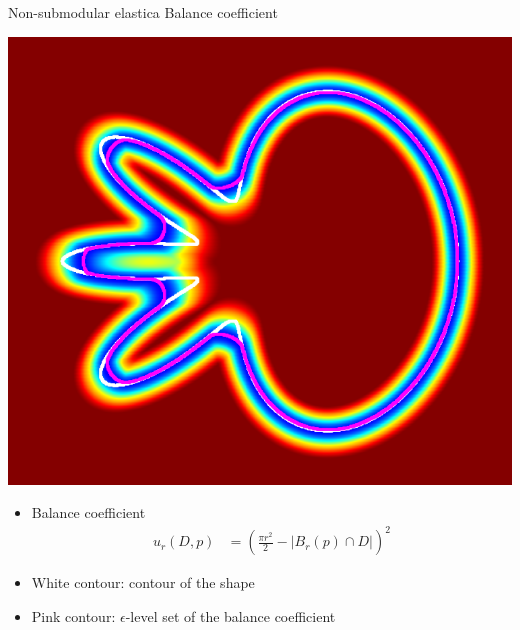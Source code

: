 \begin{frame}
{Non-submodular elastica}
{Balance coefficient}
\begin{minipage}{0.5\textwidth}
\center
\includegraphics[scale=0.2]{figures/non-submodular-elastica/balance-coefficient-zero-level-set.png}
\end{minipage}
\begin{minipage}{0.49\textwidth}
\footnotesize
\begin{itemize}
\item{Balance coefficient}
\begin{align*}
u_r(D,p) &= \left( \frac{\pi r^2}{2} - |B_r(p) \cap D| \right)^2
\end{align*}
\item{White contour: contour of the shape}
\item{Pink contour: $\epsilon$-level set of the balance coefficient}
\end{itemize}
\end{minipage}
\end{frame}

